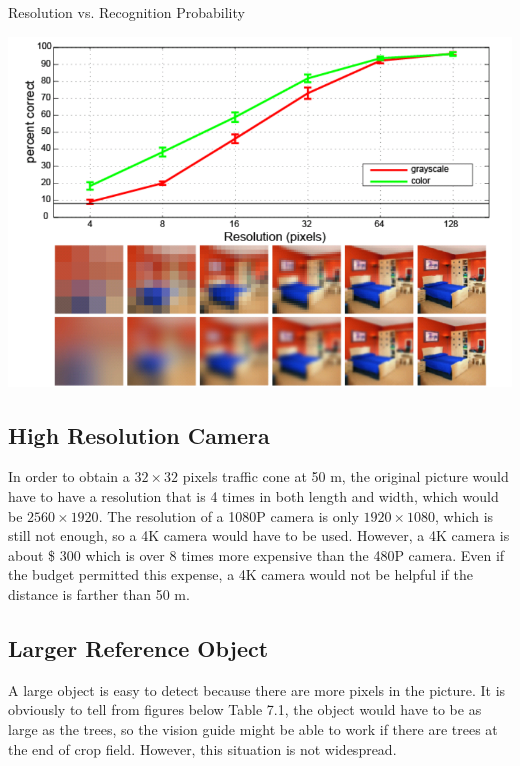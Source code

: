 \documentclass[letterpaper,12pt,oneside]{book}
\begin{document}
		\begin{table}[ht!]
			\begin{center}
				\caption{Resolution vs. Recognition Probability}
				\includegraphics[scale = 0.6]{pixel.png}
			\end{center}
		\end{table}
		
		\subsection{High Resolution Camera}
			
		In order to obtain a $32\times32$ pixels traffic cone at 50 m, the original picture would have to have a resolution that is 4 times in both length and width, which would be $2560\times1920$. The resolution of a 1080P camera is only $1920\times1080$, which is still not enough, so a 4K camera would have to be used. However, a 4K camera is about \$ 300 which is over 8 times more expensive than the 480P camera. Even if the budget permitted this expense, a 4K camera would not be helpful if the distance is farther than 50 m.
		\subsection{Larger Reference Object}
			
		A large object is easy to detect because there are more pixels in the picture. It is obviously to tell from figures below Table 7.1, the object would have to be as large as the trees, so the vision guide might be able to work if there are trees at the end of crop field. However, this situation is not widespread.
			
\end{document}
